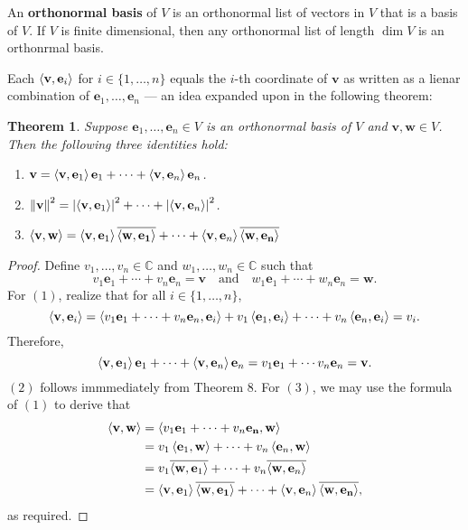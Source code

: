 \documentclass[11pt]{article}
\renewcommand{\vec}[1]{\mathbf{#1}}
\newcommand{\conjugate}[1]{\overline{#1}}
\newtheorem{theorem}{Theorem}
\begin{document}
An \textbf{orthonormal basis} of $V$ is an orthonormal list of vectors in $V$ that is a basis of $V$. If $V$ is finite dimensional, then any orthonormal list of length $\dim V$ is an orthonrmal basis.

\newpage

Each $\ev{\vec{v}, \vec{e}_{i}}$ for $i \in \{ 1, \ldots, n \}$ equals the $i$-th coordinate of $\vec{v}$ as written as a lienar combination of $\vec{e}_{1}, \ldots, \vec{e}_{n}$ --- an idea expanded upon in the following theorem:

\begin{theorem}
	Suppose $\vec{e}_{1}, \ldots, \vec{e}_{n} \in V$ is an orthonormal basis of $V$ and $\vec{v}, \vec{w} \in V$. Then the following three identities hold:
	\begin{enumerate}
		\item $\vec{v} = \ev{\vec{v}, \vec{e}_{1}} \vec{e}_{1} + \cdots + \ev{\vec{v}, \vec{e}_{n}} \vec{e}_{n}$.
		\item $\norm{\vec{v}}^{2} = \abs{\ev{\vec{v}, \vec{e}_{1}}}^{2} + \cdots + \abs{\ev{\vec{v}, \vec{e}_{n}}}^{2}$.
		\item $\ev{\vec{v}, \vec{w}} = \ev{\vec{v}, \vec{e}_{1}} \conjugate{\ev{\vec{w}, \vec{e_{1}}}} + \cdots + \ev{\vec{v}, \vec{e}_{n}} \conjugate{\ev{\vec{w}, \vec{e_{n}}}}$
	\end{enumerate}
\end{theorem}
\begin{adjustwidth}{1cm}{}
	\begin{proof}
		Define $v_{1}, \ldots, v_{n} \in \mathbb{C}$ and $w_{1}, \ldots, w_{n} \in \mathbb{C}$ such that
		\[
			v_{1} \vec{e}_{1} + \cdots + v_{n} \vec{e}_{n} = \vec{v} \quad \text{and} \quad w_{1} \vec{e}_{1} + \cdots + w_{n} \vec{e}_{n} = \vec{w}.
		\]
		For $(1)$, realize that for all $i \in \{ 1, \ldots, n \}$, 
		\[
			\ev{\vec{v}, \vec{e}_{i}} = \ev{v_{1} \vec{e}_{1} + \cdots + v_{n} \vec{e}_{n}, \vec{e}_{i}} + v_{1} \ev{\vec{e}_{1}, \vec{e}_{i}} + \cdots + v_{n} \ev{\vec{e}_{n}, \vec{e}_{i}} = v_{i}.
		\]
		Therefore, 
		\[
			\ev{\vec{v}, \vec{e}_{1}} \vec{e}_{1} + \cdots + \ev{\vec{v}, \vec{e}_{n}} \vec{e}_{n} = v_{1} \vec{e}_{1} + \cdots v_{n} \vec{e}_{n} = \vec{v}.
		\]
		$(2)$ follows immmediately from Theorem 8. For $(3)$, we may use the formula of $(1)$ to derive that
		\begin{align*}
			\ev{\vec{v}, \vec{w}} &= \ev{v_{1} \vec{e}_{1} + \cdots + v_{n} \vec{e_{n}}, \vec{w}} \\
			&= v_{1} \ev{\vec{e}_{1}, \vec{w}} + \cdots + v_{n} \ev{\vec{e}_{n}, \vec{w}} \\
			&= v_{1} \conjugate{\ev{\vec{w}, \vec{e}_{1}}} + \cdots + v_{n} \conjugate{\ev{\vec{w}, \vec{e}_{n}}} \\
			&= \ev{\vec{v}, \vec{e}_{1}} \conjugate{\ev{\vec{w}, \vec{e_{1}}}} + \cdots + \ev{\vec{v}, \vec{e}_{n}} \conjugate{\ev{\vec{w}, \vec{e_{n}}}},
		\end{align*}
		as required.	
	\end{proof}
\end{adjustwidth}

\end{document}
